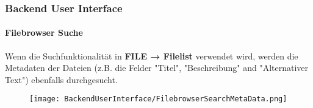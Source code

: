 \begin{frame}[fragile]
	\frametitle{Backend User Interface}
	\framesubtitle{Filebrowser Suche}

	Wenn die Suchfunktionalität in \textbf{FILE → Filelist} verwendet wird, werden die Metadaten
	der Dateien (z.B. die Felder "Titel", "Beschreibung" and "Alternativer Text") ebenfalls
	durchgesucht.

	\begin{figure}
		\texttt{[image: BackendUserInterface/FilebrowserSearchMetaData.png]}
	\end{figure}

\end{frame}

